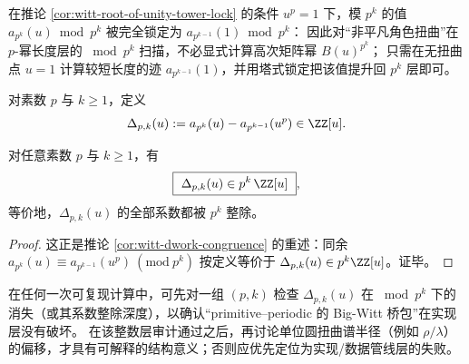 \begin{remark}\label{rem:witt-root-of-unity-acceleration}
在推论 \ref{cor:witt-root-of-unity-tower-lock} 的条件 \(u^p=1\) 下，模 \(p^k\) 的值
\(
a_{p^k}(u)\bmod p^k
\)
被完全锁定为
\(
a_{p^{k-1}}(1)\bmod p^k
\)：
因此对“非平凡角色扭曲”在 \(p\)-幂长度层的 \(\bmod p^k\) 扫描，不必显式计算高次矩阵幂
\(
B(u)^{p^k}
\)；
只需在无扭曲点 \(u=1\) 计算较短长度的迹 \(a_{p^{k-1}}(1)\)，并用塔式锁定把该值提升回 \(p^k\) 层即可。
\end{remark}

\begin{definition}\label{def:witt-frobenius-defect}
对素数 \(p\) 与 \(k\ge 1\)，定义
\[
\Delta_{p,k}(u):=a_{p^k}(u)-a_{p^{k-1}}(u^p)\in\ZZ[u].
\]
\end{definition}

\begin{proposition}\label{prop:witt-frobenius-defect-divisibility}
对任意素数 \(p\) 与 \(k\ge 1\)，有
\[
\boxed{\ \Delta_{p,k}(u)\in p^k\,\ZZ[u]\ },
\]
等价地，\(\Delta_{p,k}(u)\) 的全部系数都被 \(p^k\) 整除。
\end{proposition}
\begin{proof}
这正是推论 \ref{cor:witt-dwork-congruence} 的重述：同余
\(
a_{p^k}(u)\equiv a_{p^{k-1}}(u^p)\ (\mathrm{mod}\ p^k)
\)
按定义等价于 \(\Delta_{p,k}(u)\in p^k\ZZ[u]\)。证毕。
\end{proof}

\begin{remark}[整数层审计与谱层指标的分层]\label{rem:witt-frobenius-defect-audit}
在任何一次可复现计算中，可先对一组 \((p,k)\) 检查 \(\Delta_{p,k}(u)\) 在 \(\bmod p^k\) 下的消失（或其系数整除深度），以确认“primitive--periodic 的 Big-Witt 桥包”在实现层没有破坏。
在该整数层审计通过之后，再讨论单位圆扭曲谱半径（例如 \(\rho/\lambda\)）的偏移，才具有可解释的结构意义；否则应优先定位为实现/数据管线层的失败。
\end{remark}

